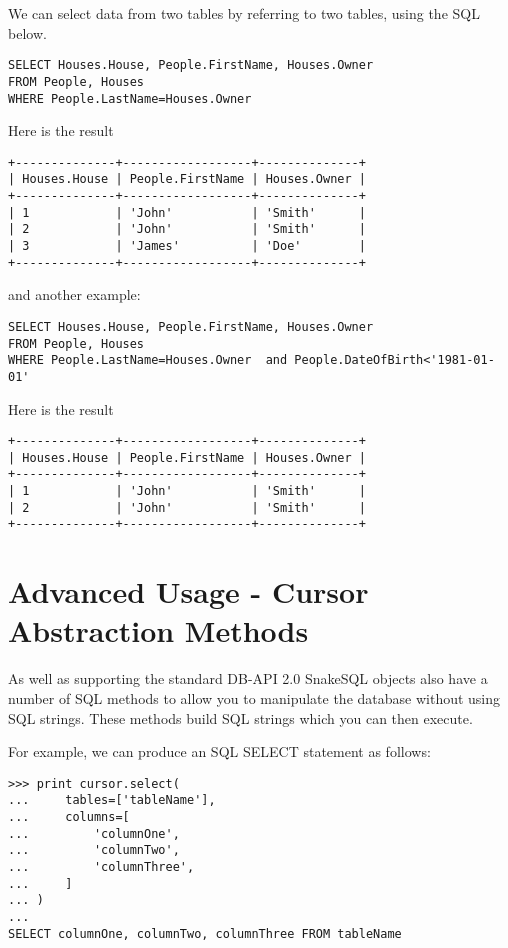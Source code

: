 \documentclass{howto}
\begin{document}
We can select data from two tables by referring to two tables, using the SQL below. 

\begin{verbatim}
SELECT Houses.House, People.FirstName, Houses.Owner 
FROM People, Houses 
WHERE People.LastName=Houses.Owner
\end{verbatim}

Here is the result
\begin{verbatim}
+--------------+------------------+--------------+
| Houses.House | People.FirstName | Houses.Owner |
+--------------+------------------+--------------+
| 1            | 'John'           | 'Smith'      |
| 2            | 'John'           | 'Smith'      |
| 3            | 'James'          | 'Doe'        |
+--------------+------------------+--------------+
\end{verbatim}

and another example:

\begin{verbatim}
SELECT Houses.House, People.FirstName, Houses.Owner 
FROM People, Houses 
WHERE People.LastName=Houses.Owner  and People.DateOfBirth<'1981-01-01'
\end{verbatim}

Here is the result
\begin{verbatim}
+--------------+------------------+--------------+
| Houses.House | People.FirstName | Houses.Owner |
+--------------+------------------+--------------+
| 1            | 'John'           | 'Smith'      |
| 2            | 'John'           | 'Smith'      |
+--------------+------------------+--------------+
\end{verbatim}

\section{Advanced Usage - Cursor Abstraction Methods}

As well as supporting the standard DB-API 2.0 SnakeSQL  objects also have a number of SQL methods to allow you to manipulate the database without using SQL strings. These methods build SQL strings which you can then execute.

For example, we can produce an SQL SELECT statement as follows:

\begin{verbatim}
>>> print cursor.select(
...     tables=['tableName'],
...     columns=[
...         'columnOne',
...         'columnTwo',
...         'columnThree',
...     ]
... )
...
SELECT columnOne, columnTwo, columnThree FROM tableName
\end{verbatim}
\end{document}
